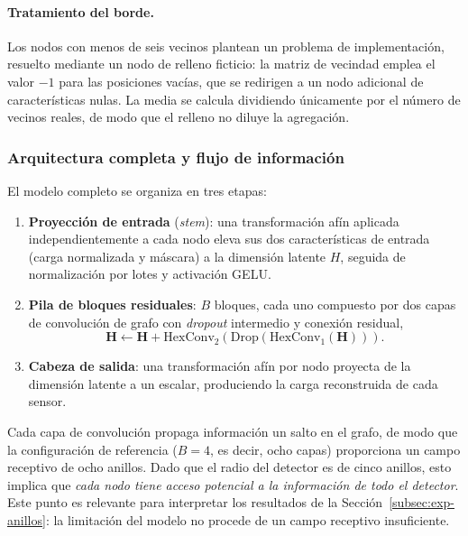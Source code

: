 \paragraph{Tratamiento del borde.} Los nodos con menos de seis vecinos plantean un problema de
implementación, resuelto mediante un nodo de relleno ficticio: la matriz de vecindad emplea el valor
$-1$ para las posiciones vacías, que se redirigen a un nodo adicional de características nulas. La
media se calcula dividiendo únicamente por el número de vecinos reales, de modo que el relleno no
diluye la agregación.

\subsubsection{Arquitectura completa y flujo de información}

El modelo completo se organiza en tres etapas:

\begin{enumerate}
    \item \textbf{Proyección de entrada} (\emph{stem}): una transformación afín aplicada
    independientemente a cada nodo eleva sus dos características de entrada (carga normalizada y
    máscara) a la dimensión latente $H$, seguida de normalización por lotes y activación GELU.

    \item \textbf{Pila de bloques residuales}: $B$ bloques, cada uno compuesto por dos capas de
    convolución de grafo con \emph{dropout} intermedio y conexión residual,
    \begin{equation}
        \mathbf{H} \leftarrow \mathbf{H} + \mathrm{HexConv}_2(\mathrm{Drop}(\mathrm{HexConv}_1(\mathbf{H}))).
    \end{equation}

    \item \textbf{Cabeza de salida}: una transformación afín por nodo proyecta de la dimensión
    latente a un escalar, produciendo la carga reconstruida de cada sensor.
\end{enumerate}

Cada capa de convolución propaga información un salto en el grafo, de modo que la configuración de
referencia ($B = 4$, es decir, ocho capas) proporciona un campo receptivo de ocho anillos. Dado que
el radio del detector es de cinco anillos, esto implica que \emph{cada nodo tiene acceso potencial a
la información de todo el detector}. Este punto es relevante para interpretar los resultados de la
Sección~\ref{subsec:exp-anillos}: la limitación del modelo no procede de un campo receptivo
insuficiente.

